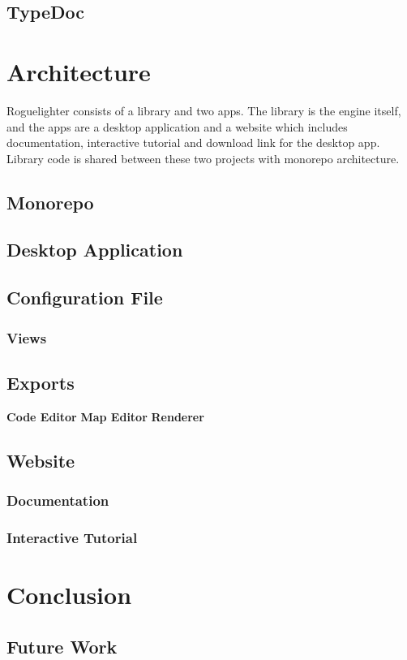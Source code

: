 \documentclass{article}
\begin{document}
\subsection{TypeDoc}

\section{Architecture}
Roguelighter consists of a library and two apps. The library is the engine itself, and the apps are a desktop application and a website which includes documentation, interactive tutorial and download link for the desktop app. Library code is shared between these two projects with monorepo architecture.

\subsection{Monorepo}
\subsection{Desktop Application}
\subsection{Configuration File}
\subsubsection{Views}
\subsection{Exports}

\textbf{Code Editor}
\textbf{Map Editor}
\textbf{Renderer}
\subsection{Website}
\subsubsection{Documentation}
\subsubsection{Interactive Tutorial}

\section{Conclusion}
\subsection{Future Work}
\printbibliography
\listoffigures
\end{document}
